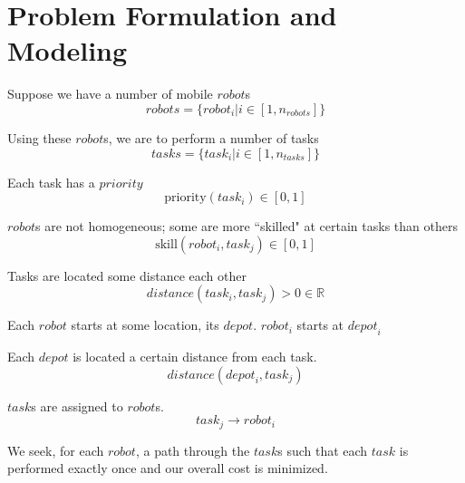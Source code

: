 \documentclass[a4paper]{article}
\begin{document}
\section{Problem Formulation and Modeling}


%
%


Suppose we have a number of mobile $\mathit{robot}$s
$$\mathit{robots} = \{ \mathit{robot}_i | i \in [1, n_\mathit{robots}] \}$$

Using these $\mathit{robot}$s, we are to perform a number of tasks
$$\mathit{tasks} = \{ \mathit{task}_i | i \in [1, n_\mathit{tasks}] \}$$

Each task has a $\mathit{priority}$
$$\text{priority}(\mathit{task}_i) \in [0 ,1]$$

$\mathit{robot}$s are not homogeneous; some are more ``skilled" at certain tasks than others
$$\text{skill}(\mathit{robot}_i, \mathit{task}_j) \in [0 ,1]$$

Tasks are located some distance each other
$$\mathit{distance}(\mathit{task}_i, \mathit{task}_j) > 0 \in \mathbb{R}$$

Each $\mathit{robot}$ starts at some location, its $\mathit{depot}$. $\mathit{robot}_i$ starts at $\mathit{depot}_i$

Each $\textit{depot}$ is located a certain distance from each task.
$$\mathit{distance}(\mathit{depot}_i, \mathit{task}_j)$$

$\mathit{task}$s are assigned to $\mathit{robot}$s.
$$\mathit{task}_j \rightarrow \mathit{robot}_i$$

We seek, for each $\mathit{robot}$, a path through the $\mathit{task}$s such that each $\mathit{task}$ is performed exactly once and our overall cost is minimized.
\end{document}
